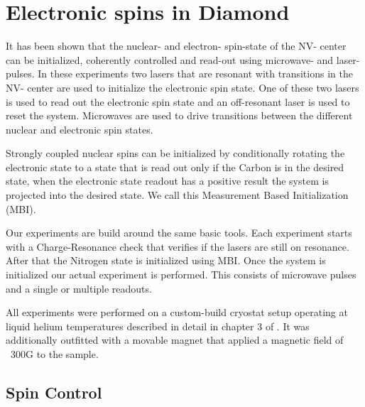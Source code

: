 \chapter{Electronic spins in Diamond}
\label{controlingspinsindiamond}




It has been shown that the nuclear- and electron- spin-state of the NV- center can be initialized, coherently controlled and read-out using microwave- and laser- pulses\cite{Robledo2011HighFidelity}. In these experiments two lasers that are resonant with transitions in the NV- center are used to initialize the electronic spin state. One of these two lasers is used to read out the electronic spin state and an off-resonant laser is used to reset the system.  Microwaves are used to drive transitions between the different nuclear and electronic spin states.

Strongly coupled nuclear spins can be initialized by conditionally rotating the electronic state to a state that is read out only if the Carbon is in the desired state, when the electronic state readout has a positive result the system is projected into the desired state. We call this Measurement Based Initialization (MBI).

Our experiments are build around the same basic tools. Each experiment starts with a Charge-Resonance check that verifies if the lasers are still on resonance. After that the Nitrogen state is initialized using MBI. Once the system is initialized our actual experiment is performed. This consists of microwave pulses and a single or multiple readouts.

All experiments were performed on a custom-build cryostat setup operating at liquid helium temperatures described in detail in chapter 3 of \cite{Bernien2014Control}. It was additionally outfitted with a movable magnet that applied a magnetic field of ~300G to the sample.

\section{Spin Control}
\label{spincontrol}

